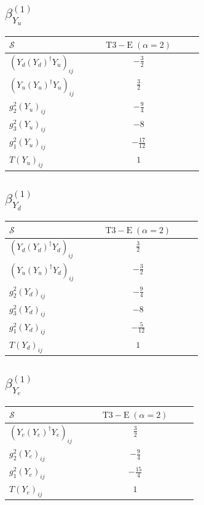 \documentclass[9pt]{article}
\begin{document}
\subsection*{$ \beta_{Y_u}^{(1)} $}
\begin{longtable}{@{}p{0.38\linewidth}c@{}}
\toprule
$\mathcal{S}$ & $ \mathrm{T3-E}\;(\alpha=2) $ \\
\midrule
$ (Y_d (Y_d)^{\dagger} Y_u)_{ij} $ & $ - \frac{3}{2} $ \\
$ (Y_u (Y_u)^{\dagger} Y_u)_{ij} $ & $ \frac{3}{2} $ \\
$ g_2^2 (Y_u)_{ij} $ & $ - \frac{9}{4} $ \\
$ g_3^2 (Y_u)_{ij} $ & $ -8 $ \\
$ g_1^2 (Y_u)_{ij} $ & $ - \frac{17}{12} $ \\
$ T (Y_u)_{ij} $ & $ 1 $ \\
\bottomrule
\end{longtable}
\subsection*{$ \beta_{Y_d}^{(1)} $}
\begin{longtable}{@{}p{0.38\linewidth}c@{}}
\toprule
$\mathcal{S}$ & $ \mathrm{T3-E}\;(\alpha=2) $ \\
\midrule
$ (Y_d (Y_d)^{\dagger} Y_d)_{ij} $ & $ \frac{3}{2} $ \\
$ (Y_u (Y_u)^{\dagger} Y_d)_{ij} $ & $ - \frac{3}{2} $ \\
$ g_2^2 (Y_d)_{ij} $ & $ - \frac{9}{4} $ \\
$ g_3^2 (Y_d)_{ij} $ & $ -8 $ \\
$ g_1^2 (Y_d)_{ij} $ & $ - \frac{5}{12} $ \\
$ T (Y_d)_{ij} $ & $ 1 $ \\
\bottomrule
\end{longtable}
\subsection*{$ \beta_{Y_e}^{(1)} $}
\begin{longtable}{@{}p{0.38\linewidth}c@{}}
\toprule
$\mathcal{S}$ & $ \mathrm{T3-E}\;(\alpha=2) $ \\
\midrule
$ (Y_e (Y_e)^{\dagger} Y_e)_{ij} $ & $ \frac{3}{2} $ \\
$ g_2^2 (Y_e)_{ij} $ & $ - \frac{9}{4} $ \\
$ g_1^2 (Y_e)_{ij} $ & $ - \frac{15}{4} $ \\
$ T (Y_e)_{ij} $ & $ 1 $ \\
\bottomrule
\end{longtable}
\end{document}
